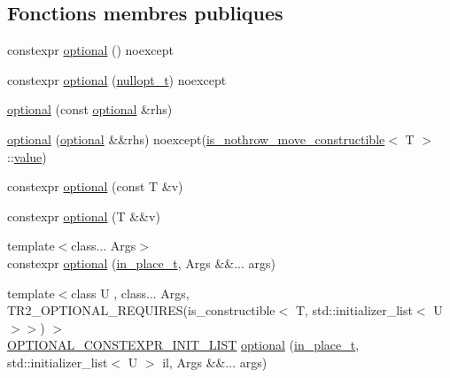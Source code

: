 \subsection*{Fonctions membres publiques}
\begin{DoxyCompactItemize}
\item 
constexpr \hyperlink{classstd_1_1experimental_1_1optional_a1584b48b65b92c4666c9899cd8b034e0}{optional} () noexcept
\item 
constexpr \hyperlink{classstd_1_1experimental_1_1optional_a4254acbb52e75c196ab02784ce4b1ce2}{optional} (\hyperlink{structstd_1_1experimental_1_1nullopt__t}{nullopt\+\_\+t}) noexcept
\item 
\hyperlink{classstd_1_1experimental_1_1optional_a08324fd562beb2f0a43b242596b47b2b}{optional} (const \hyperlink{classstd_1_1experimental_1_1optional}{optional} \&rhs)
\item 
\hyperlink{classstd_1_1experimental_1_1optional_aef3982e3d2d30c05d3d80ede551fda76}{optional} (\hyperlink{classstd_1_1experimental_1_1optional}{optional} \&\&rhs) noexcept(\hyperlink{structstd_1_1experimental_1_1is__nothrow__move__constructible}{is\+\_\+nothrow\+\_\+move\+\_\+constructible}$<$ T $>$\+::\hyperlink{classstd_1_1experimental_1_1optional_ad1277f09c288255dfe102b72e7107be6}{value})
\item 
constexpr \hyperlink{classstd_1_1experimental_1_1optional_acd004943841f3f762c73924471addd1b}{optional} (const T \&v)
\item 
constexpr \hyperlink{classstd_1_1experimental_1_1optional_a0eabb5769fc6c11a61bc004b314db7d1}{optional} (T \&\&v)
\item 
{\footnotesize template$<$class... Args$>$ }\\constexpr \hyperlink{classstd_1_1experimental_1_1optional_ab82edfd1f44d875a8bf3246eaed393b6}{optional} (\hyperlink{structstd_1_1experimental_1_1in__place__t}{in\+\_\+place\+\_\+t}, Args \&\&... args)
\item 
{\footnotesize template$<$class U , class... Args, T\+R2\+\_\+\+O\+P\+T\+I\+O\+N\+A\+L\+\_\+\+R\+E\+Q\+U\+I\+R\+E\+S(is\+\_\+constructible$<$ T, std\+::initializer\+\_\+list$<$ U $>$$>$) $>$ }\\\hyperlink{optional_8h_a7399114ed1c146a67741cdd1f681fcb5}{O\+P\+T\+I\+O\+N\+A\+L\+\_\+\+C\+O\+N\+S\+T\+E\+X\+P\+R\+\_\+\+I\+N\+I\+T\+\_\+\+L\+I\+ST} \hyperlink{classstd_1_1experimental_1_1optional_a52252028f9d99a680f7059ff48593985}{optional} (\hyperlink{structstd_1_1experimental_1_1in__place__t}{in\+\_\+place\+\_\+t}, std\+::initializer\+\_\+list$<$ U $>$ il, Args \&\&... args)

\end{DoxyCompactItemize}
